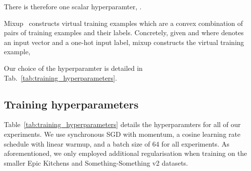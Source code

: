 \documentclass[10pt,twocolumn,letterpaper]{article}
\makeatletter
\renewcommand{\paragraph}{\@startsection{paragraph}{4}{\z@}{1.625ex \@plus 1ex \@minus .2ex}{-1em}{\normalfont\normalsize\bfseries}}
\makeatother
\begin{document}
There is therefore one scalar hyperparamter, .

\paragraph{Mixup}
Mixup~\cite{zhang_mixup_iclr_2018} constructs virtual training examples which are a convex combination of pairs of training examples and their labels.
Concretely, given  and  where  denotes an input vector and  a one-hot input label, mixup constructs the virtual training example,

Our choice of the hyperparamter  is detailed in Tab.~\ref{tab:training_hyperparameters}.


\subsection{Training hyperparameters}
\label{sec:hyperparameters}

Table~\ref{tab:training_hyperparameters} details the hyperparamters for all of our experiments.
We use synchronous SGD with momentum, a cosine learning rate schedule with linear warmup, and a batch size of 64 for all experiments.
As aforementioned, we only employed additional regularisation when training on the smaller Epic Kitchens and Something-Something v2 datasets. 
\end{document}
